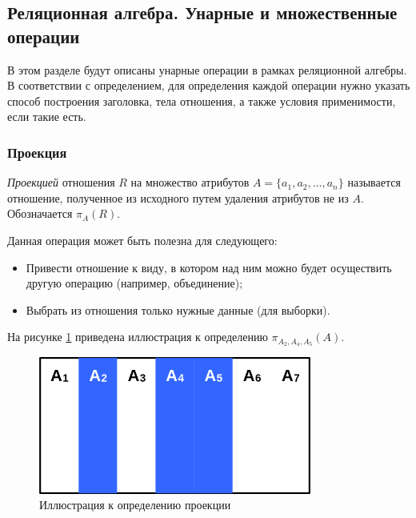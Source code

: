 \subsection{Реляционная алгебра. Унарные и множественные операции}

В этом разделе будут описаны унарные операции в рамках реляционной алгебры. В соответствии с
определением, для определения каждой операции нужно указать способ построения заголовка, тела
отношения, а также условия применимости, если такие есть.

\subsubsection{Проекция}

\begin{definition}
	\textit{Проекцией} отношения $R$ на множество атрибутов
	$A = \{ a_1, a_2, \ldots, a_n \}$ называется отношение, полученное из исходного путем
	удаления атрибутов не из $A$. Обозначается $\pi_A(R)$.
\end{definition}

Данная операция может быть полезна для следующего:
\begin{itemize}
	\item Привести отношение к виду, в котором над ним можно будет осуществить другую операцию (например,
	      объединение);
	\item Выбрать из отношения только нужные данные (для выборки).
\end{itemize}

На рисунке \ref{proj-def} приведена иллюстрация к определению $\pi_{A_2, A_4, A_5}(A)$.

\begin{figure}[h]
	\centering
	\includegraphics[width=0.8\textwidth]{../assets/kgeorgiy/relalgebra/Primitive_Projection_0.svg.png}
	\caption{Иллюстрация к определению проекции}
	\label{proj-def}
\end{figure}

